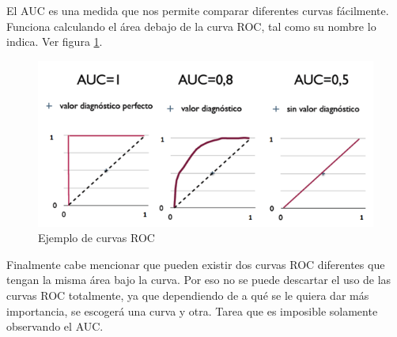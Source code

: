 El \ac{AUC} es una medida que nos permite comparar diferentes curvas fácilmente. Funciona calculando el área debajo de la curva ROC, tal como su nombre lo indica. Ver figura \ref{fig:eg-roc}.

\begin{figure}
    \centering
    \caption{Ejemplo de curvas ROC}
    \label{fig:eg-roc}
    \includegraphics[width=0.8\linewidth]{graficos/eg_roc.png}
\end{figure}

Finalmente cabe mencionar que pueden existir dos curvas ROC diferentes que tengan la misma área bajo la curva. Por eso no se puede descartar el uso de las curvas ROC totalmente, ya que dependiendo de a qué se le quiera dar más importancia, se escogerá una curva y otra. Tarea que es imposible solamente observando el \ac{AUC}.





